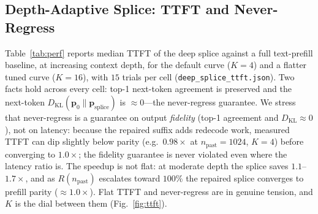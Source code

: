 \documentclass[10pt,conference]{IEEEtran}
\newcommand{\code}[1]{\texttt{\small #1}}
\begin{document}
\subsection{Depth-Adaptive Splice: TTFT and Never-Regress}
Table~\ref{tab:perf} reports median TTFT of the deep splice against a full text-prefill baseline,
at increasing context depth, for the default curve ($K=4$) and a flatter tuned curve ($K=16$),
with $15$ trials per cell (\code{deep\_splice\_ttft.json}). Two facts hold across every cell:
top-1 next-token agreement is preserved and the next-token $D_{\mathrm{KL}}(\mathbf{p}_0 \parallel \mathbf{p}_{\mathrm{splice}})$ is $\approx 0$---the never-regress guarantee.
We stress that never-regress is a guarantee on output \emph{fidelity} (top-1 agreement and
$D_{\mathrm{KL}}\approx 0$), not on latency: because the repaired suffix adds redecode work, measured
TTFT can dip slightly below parity (e.g.\ $0.98\times$ at $n_{\mathrm{past}}=1024$, $K=4$) before
converging to $1.0\times$; the fidelity guarantee is never violated even where the latency ratio is.
The speedup is not flat: at moderate depth the splice saves $1.1$--$1.7\times$, and as
$R(n_{\mathrm{past}})$ escalates toward $100\%$ the repaired splice converges to prefill parity
($\approx 1.0\times$). Flat TTFT and never-regress are in genuine tension, and $K$ is the dial
between them (Fig.~\ref{fig:ttft}).
\end{document}
